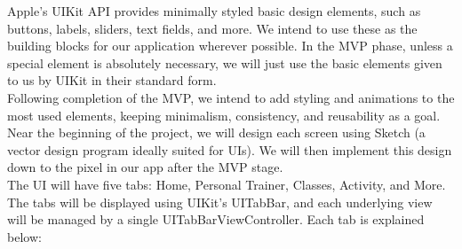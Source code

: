 \documentclass[letterpaper,10pt,titlepage]{article}
\begin{document}
Apple’s UIKit API provides minimally styled basic design elements, such as buttons, labels, sliders, text fields, and more. We intend to use these as the building blocks for our application wherever possible. In the MVP phase, unless a special element is absolutely necessary, we will just use the basic elements given to us by UIKit in their standard form.\\


Following completion of the MVP, we intend to add styling and animations to the most used elements, keeping minimalism, consistency, and reusability as a goal. Near the beginning of the project, we will design each screen using Sketch (a vector design program ideally suited for UIs). We will then implement this design down to the pixel in our app after the MVP stage.\\


The UI will have five tabs: Home, Personal Trainer, Classes, Activity, and More. The tabs will be displayed using UIKit’s UITabBar, and each underlying view will be managed by a single UITabBarViewController. Each tab is explained below:\\

\end{document}
